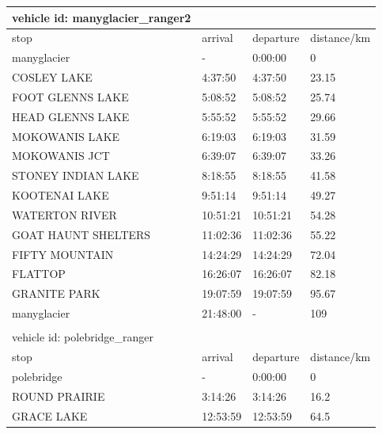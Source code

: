 \documentclass[12pt]{article}
\begin{document}
\begin{appendices}
\begin{table}[ht!]
\begin{tabular}{@{}llll@{}}
\toprule
vehicle id: manyglacier\_ranger2 &          &           &             \\ \midrule
stop                             & arrival  & departure & distance/km \\
manyglacier                      & -        & 0:00:00   & 0           \\
COSLEY LAKE                      & 4:37:50  & 4:37:50   & 23.15       \\
FOOT GLENNS LAKE                 & 5:08:52  & 5:08:52   & 25.74       \\
HEAD GLENNS LAKE                 & 5:55:52  & 5:55:52   & 29.66       \\
MOKOWANIS LAKE                   & 6:19:03  & 6:19:03   & 31.59       \\
MOKOWANIS JCT                    & 6:39:07  & 6:39:07   & 33.26       \\
STONEY INDIAN LAKE               & 8:18:55  & 8:18:55   & 41.58       \\
KOOTENAI LAKE                    & 9:51:14  & 9:51:14   & 49.27       \\
WATERTON RIVER                   & 10:51:21 & 10:51:21  & 54.28       \\
GOAT HAUNT SHELTERS              & 11:02:36 & 11:02:36  & 55.22       \\
FIFTY MOUNTAIN                   & 14:24:29 & 14:24:29  & 72.04       \\
FLATTOP                          & 16:26:07 & 16:26:07  & 82.18       \\
GRANITE PARK                     & 19:07:59 & 19:07:59  & 95.67       \\
manyglacier                      & 21:48:00 & -         & 109         \\ \bottomrule
                                 &          &           &             \\ \toprule
vehicle id: polebridge\_ranger   &          &           &             \\ \midrule
stop                             & arrival  & departure & distance/km \\
polebridge                       & -        & 0:00:00   & 0           \\
ROUND PRAIRIE                    & 3:14:26  & 3:14:26   & 16.2        \\
GRACE LAKE                       & 12:53:59 & 12:53:59  & 64.5        \\

\end{tabular}
\end{table}
\end{appendices}
\end{document}
